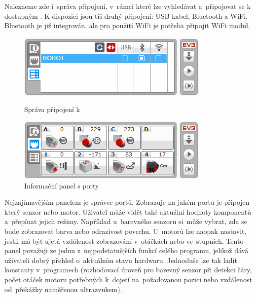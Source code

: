 Nalezneme zde i~správa připojení, v~rámci které lze vyhledávat a~připojovat se k dostupným . 
K dispozici jsou tři druhý připojení: USB kabel, Bluetooth a WiFi. Bluetooth je již integrován, ale pro použití WiFi je potřeba připojit WiFi modul.

\begin{figure}[h]
	\begin{minipage}[b]{.48\textwidth}
		\centering
		\includegraphics[width=\textwidth]{images/lego-soft/lego-soft_brick-manager_connected.png}
		\caption{Správa připojení k }
		\label{fig:lego-soft_brick-manager-connected}
	\end{minipage}
	\hfill
	\begin{minipage}[b]{.48\textwidth}
		\centering
		\includegraphics[width=\textwidth]{images/lego-soft/lego-soft_brick_port-view.png}
		\caption{Informační panel s porty}
		\label{fig:lego-soft_brick_port-view}
	\end{minipage}
\end{figure}

Nejzajímavějším panelem je správce portů. 
Zobrazuje na jakém portu je připojen který senzor nebo motor. 
Uživatel může vidět také aktuální hodnoty komponentů a~přepínat jejich režimy.    
Například u~barevného senzoru si~může vybrat, zda se bude zobrazovat barva nebo odrazivost povrchu. U~motorů lze naopak nastavit, jestli má být ujetá vzdálenost zobrazování v~otáčkách nebo ve~stupních. 
Tento panel považuji ze jednu z~nejpodstatnějších funkcí celého programu, jelikož dává uživateli dobrý přehled o~aktuálním stavu hardwaru. 
Jednoduše lze tak ladit konstanty v~programech (rozhodovací úroveň pro barevný senzor při detekci čáry, počet otáček motoru potřebných k~dojetí na~požadovanou pozici nebo vzdálenost od~překážky naměřenou ultrazvukem). 

